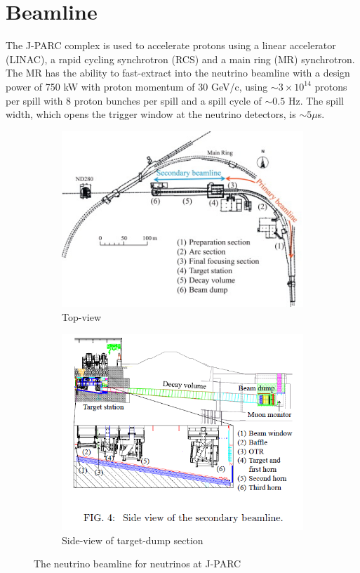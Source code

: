 \section{Beamline}
The J-PARC complex\cite{jparc_tdr} is used to accelerate protons using a linear accelerator (LINAC), a rapid cycling synchrotron (RCS) and a main ring (MR) synchrotron. The MR has the ability to fast-extract into the neutrino beamline with a design power of 750 kW with proton momentum of 30 GeV/c, using $\sim3\times10^{14}$ protons per spill with 8 proton bunches per spill and a spill cycle of $\sim0.5$ Hz. The spill width, which opens the trigger window at the neutrino detectors, is $\sim5 \mu$s\cite{t2k_det}.
\begin{figure}[h]
	\begin{subfigure}[t]{0.4\textwidth}
		\includegraphics[width=\textwidth, trim={0mm 0mm 0mm 0mm}, clip,page=1]{figures/det_chap/beam/beam.jpg}
		\caption{Top-view}
	\end{subfigure}
	\begin{subfigure}[t]{0.4\textwidth}
		\includegraphics[width=\textwidth, trim={0mm 18mm 0mm 0mm}, clip,page=1]{figures/det_chap/beam/sideview_beam}
		\caption{Side-view of target-dump section}
	\end{subfigure}
	\caption{The neutrino beamline for neutrinos at J-PARC}
	\label{fig:neutrino_beamline}
\end{figure}


